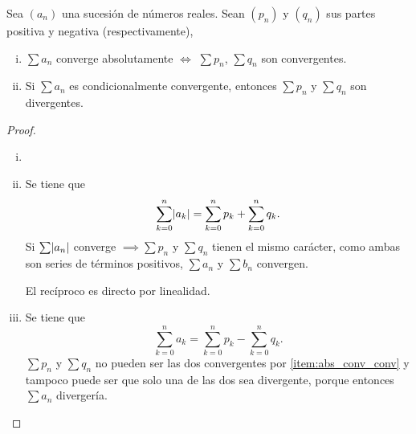 \begin{example*} \hspace{0pt}
  \begin{center}
  \end{center}

\end{example*}

\begin{lema}
  Sea $(a_n)$ una sucesión de números reales. Sean $(p_n)$ y $(q_n)$ sus partes positiva y negativa
  (respectivamente),
  \begin{enumerate}[i)]
    \item \label{item:abs_conv_conv}
            $\sum a_n$ converge absolutamente $\iff$ $\sum p_n$, $\sum q_n$ son convergentes.
    \item Si $\sum a_n$ es condicionalmente convergente, entonces $\sum p_n$ y $\sum q_n$ son divergentes.
  \end{enumerate}
\end{lema}

\begin{proof}
  \begin{enumerate}[i)]
      \item[]
      \item Se tiene que
            \[
                \sum\limits_{k=0}^ n \abs{a_k} = \sum\limits_{k=0}^ n p_k + \sum\limits_{k=0}^n q_k.
        \]
        Si $\sum \abs{a_n}$ converge $\implies \sum p_n$ y $\sum q_n$ tienen el mismo carácter,
            como ambas son series de términos positivos, $\sum a_n$ y $\sum b_n$ convergen.

            El recíproco es directo por linealidad.
        \item Se tiene que
            \[
                \sum_{k=0}^n a_k = \sum_{k=0}^n p_k - \sum_{k=0}^n q_k.
            \]
            $\sum p_n$ y $\sum q_n$ no pueden ser las dos convergentes por \ref{item:abs_conv_conv}
            y tampoco puede ser que solo una de las dos sea divergente, porque entonces
            $\sum a_n$ divergería.
  \end{enumerate}
\end{proof}

